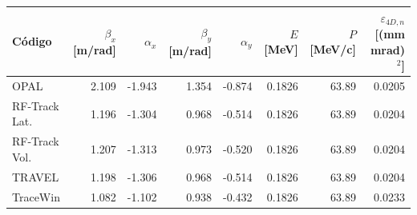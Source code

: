 \begin{tabular}{lrrrrrrr}
\toprule
Código & $\beta_x$ [m/rad] & $\alpha_x$ & $\beta_y$ [m/rad] & $\alpha_y$ & $E$ [MeV] & $P$ [MeV/c] & $\varepsilon_{4D,n}$ [(mm mrad)$^2$] \\
\midrule
OPAL & 2.109 & -1.943 & 1.354 & -0.874 & 0.1826 & 63.89 & 0.0205 \\
RF-Track Lat. & 1.196 & -1.304 & 0.968 & -0.514 & 0.1826 & 63.89 & 0.0204 \\
RF-Track Vol. & 1.207 & -1.313 & 0.973 & -0.520 & 0.1826 & 63.89 & 0.0204 \\
TRAVEL & 1.198 & -1.306 & 0.968 & -0.514 & 0.1826 & 63.89 & 0.0204 \\
TraceWin & 1.082 & -1.102 & 0.938 & -0.432 & 0.1826 & 63.89 & 0.0233 \\
\bottomrule
\end{tabular}
